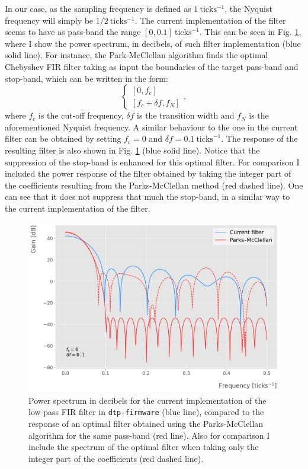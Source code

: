 In our case, as the sampling frequency is defined as $1 \ \mathrm{ticks^{-1}}$, the Nyquist frequency will simply be $1/2 \ \mathrm{ticks^{-1}}$. The current implementation of the filter seems to have as pass-band the range $[0,0.1] \ \mathrm{ticks^{-1}}$. This can be seen in Fig. \ref{fig:filter_comp}, where I show the power spectrum, in decibels, of such filter implementation (blue solid line). For instance, the Park-McClellan algorithm finds the optimal Chebyshev FIR filter taking as input the boundaries of the target pass-band and stop-band, which can be written in the form:
\begin{equation}
	\left\{ \begin{array}{c}
		\left[0, f_{c}\right] \\
		\left[ f_{c} + \delta f, f_{N}\right]
	\end{array} \right. ,
\end{equation}
where $f_{c}$ is the cut-off frequency, $\delta f$ is the transition width and $f_{N}$ is the aforementioned Nyquist frequency. A similar behaviour to the one in the current filter can be obtained by setting $f_{c} = 0$ and $\delta f = 0.1 \ \mathrm{ticks}^{-1}$. The response of the resulting filter is also shown in Fig. \ref{fig:filter_comp} (blue solid line). Notice that the suppression of the stop-band is enhanced for this optimal filter. For comparison I included the power response of the filter obtained by taking the integer part of the coefficients resulting from the Parks-McClellan method (red dashed line). One can see that it 
does not suppress that much the stop-band, in a similar way to the current implementation of the filter.

\begin{figure}[h!]
	\centering
	\includegraphics[width=0.8\linewidth]{Images/Matched_Filter/filter_comp}
	\caption[Power spectra for the current low-pass FIR filter and the optimal filter obtained using the Parks-McClellan algorithm.]{Power spectrum in decibels for the current implementation of the low-pass FIR filter in \texttt{dtp-firmware} (blue line), compared to the response of an optimal filter obtained using the Parks-McClellan algorithm for the same pass-band (red line). Also for comparison I include the spectrum of the optimal filter when taking only the integer part of the coefficients (red dashed line).}
	\label{fig:filter_comp}
\end{figure}


